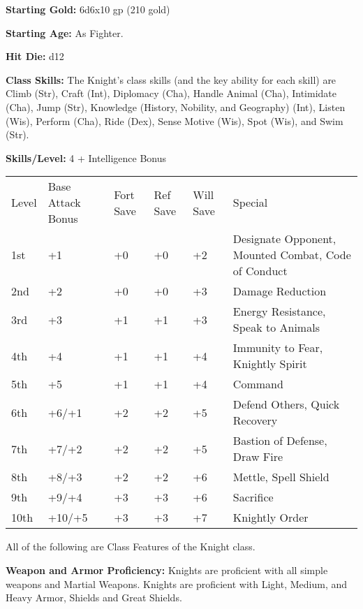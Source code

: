 \documentclass[10pt]{article}
\newcommand{\ability}[2]{\smallskip \noindent \textbf{#1} #2}
\begin{document}
\ability{Starting Gold:}{6d6x10 gp (210 gold)}

\ability{Starting Age:}{As Fighter.}

\ability{Hit Die:}{d12}

\ability{Class Skills:}{The Knight's class skills (and the key ability for each skill) are Climb (Str), Craft (Int), Diplomacy (Cha), Handle Animal (Cha), Intimidate (Cha), Jump (Str), Knowledge (History, Nobility, and Geography) (Int), Listen (Wis), Perform (Cha), Ride (Dex), Sense Motive (Wis), Spot (Wis), and Swim (Str).}

\ability{Skills/Level:}{4 + Intelligence Bonus}



\begin{table}[tbh]
\begin{small}
\begin{tabular}{lp{2cm}p{1cm}p{1cm}p{0.7cm}l}
Level  &Base Attack Bonus &Fort Save &Ref Save &Will Save &Special\\
1st &+1 &+0 &+0 &+2 &Designate Opponent, Mounted Combat, Code of Conduct\\
2nd &+2 &+0 &+0 &+3 &Damage Reduction\\
3rd &+3 &+1 &+1 &+3 &Energy Resistance, Speak to Animals\\
4th &+4 &+1 &+1 &+4 &Immunity to Fear, Knightly Spirit\\
5th &+5 &+1 &+1 &+4 &Command\\
6th &+6/+1 &+2 &+2 &+5 &Defend Others, Quick Recovery\\
7th &+7/+2 &+2 &+2 &+5 &Bastion of Defense, Draw Fire\\
8th &+8/+3 &+2 &+2 &+6 &Mettle, Spell Shield\\
9th &+9/+4 &+3 &+3 &+6 &Sacrifice\\
10th &+10/+5 &+3 &+3 &+7 &Knightly Order\\
\end{tabular}
\end{small}
\end{table}

\noindent All of the following are Class Features of the Knight class.

\ability{Weapon and Armor Proficiency:}{Knights are proficient with all simple weapons and Martial Weapons. Knights are proficient with Light, Medium, and Heavy Armor, Shields and Great Shields.}
\end{document}
